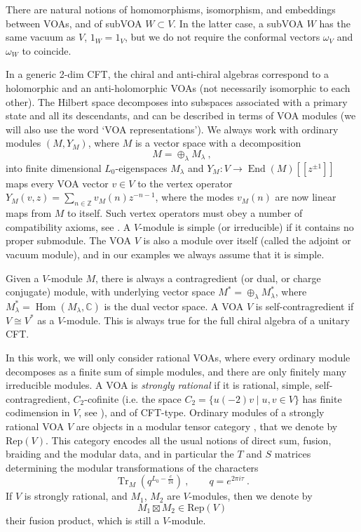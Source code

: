 \documentclass[11pt,reqno]{article}
\newcommand{\be}{\begin{equation}}
\newcommand{\ee}{\end{equation}}
\DeclareMathOperator{\Tr}{Tr}
\newcommand{\ZZ}{\mathbb{Z}}
\newcommand{\CC}{\mathbb{C}}
\DeclareMathOperator{\Hom}{Hom}
\DeclareMathOperator{\End}{End}
\begin{document}
There are natural notions of homomorphisms, isomorphism, and embeddings between VOAs, and of subVOA $W\subset V$. In the latter case, a subVOA $W$ has the same vacuum as $V$, $1_W=1_V$, but we do not require the conformal vectors $\omega_V$ and $\omega_W$ to coincide.

In a generic 2-dim CFT, the chiral and anti-chiral algebras correspond to a holomorphic and an anti-holomorphic VOAs (not necessarily isomorphic to each other). The Hilbert space decomposes into subspaces associated with a primary state and all its descendants, and can be described in terms of VOA modules (we will also use the word `VOA representations'). We always work with ordinary modules $(M, Y_M)$, where $M$ is a vector space with a decomposition
\be M=\oplus_{\lambda} M_{\lambda}\ ,
\ee into finite dimensional $L_0$-eigenspaces $M_{\lambda}$ and $Y_M:V\to \End(M)[[z^{\pm 1}]]$ maps every VOA vector $v\in V$ to the vertex operator $Y_M(v,z)=\sum_{n\in \ZZ} v_M(n) z^{-n-1}$, where the modes $v_M(n)$ are now linear maps from $M$ to itself. Such vertex operators must obey a number of compatibility axioms, see \cite{FLM1988}. A $V$-module is simple (or irreducible) if it contains no proper submodule. The VOA $V$ is also a module over itself (called the adjoint or vacuum module), and in our examples we always assume that it is simple. 

Given a $V$-module $M$, there is always a contragredient (or dual, or charge conjugate) module, with underlying vector space $M^*=\oplus_{\lambda} M^*_{\lambda}$, where $M^*_{\lambda}=\Hom(M_\lambda,\CC)$ is the dual vector space. A VOA $V$ is self-contragredient if $V\cong V^*$ as a $V$-module. This is always true for the full chiral algebra of a unitary CFT.

In this work, we will only consider rational VOAs, where every ordinary module decomposes as a finite sum of simple modules, and there are only finitely many irreducible modules. A VOA is \emph{strongly rational} if it is rational, simple, self-contragredient, $C_2$-cofinite (i.e. the space $C_2=\{u(-2)v\mid u,v\in V\}$ has finite codimension in $V$, see \cite{Zhu1996ModularInvariance}), and of CFT-type. Ordinary modules of a strongly rational VOA $V$ are objects in a modular tensor category \cite{Huang2008Rigidity}, that we denote by $\mathrm{Rep}(V)$. This category encodes all the usual notions of direct sum, fusion, braiding and the modular data, and in particular the $T$ and $S$ matrices determining the modular transformations of the characters
\be \Tr_{M}(q^{L_0-\frac{c}{24}})\ ,\qquad q=e^{2\pi i\tau}\ .
\ee If $V$ is strongly rational, and $M_1$, $M_2$ are $V$-modules, then we denote by
\be M_1\boxtimes M_2\in \mathrm{Rep}(V)
\ee their fusion product, which is still a $V$-module.
\end{document}
